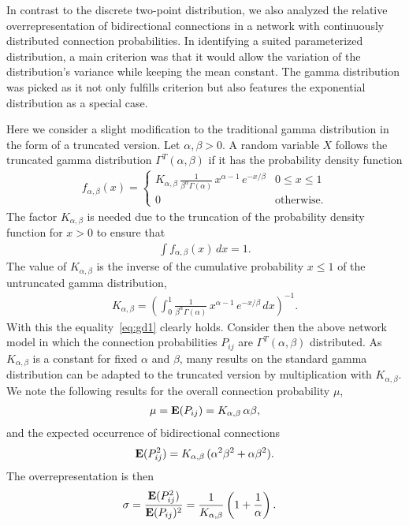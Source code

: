 
In contrast to the discrete two-point distribution, we also analyzed the relative overrepresentation of bidirectional connections in a network with continuously distributed connection probabilities. In identifying a suited parameterized distribution, a main criterion was that it would allow the variation of the distribution's variance while keeping the mean constant. The gamma distribution was picked as it not only fulfills criterion but also features the exponential distribution as a special case.

Here we consider a slight modification to the traditional gamma distribution in the form of a truncated version. Let $\alpha, \beta > 0$. A random variable $X$ follows the truncated gamma distribution $\Gamma^T(\alpha, \beta)$ if it has the probability density function 
%
\begin{align}
  f_{\alpha,\beta}(x) = \begin{cases} K_{\alpha, \beta}\,
\frac{1}{\beta^{\alpha}\Gamma(\alpha)}\, x^{\alpha-1}\,e^{-x/\beta} & 0 \leq x \leq 1 \\
0 & \text{otherwise}.
\end{cases}
\end{align}
%
The factor $K_{\alpha,\beta}$ is needed due to the truncation of the probability density function for $x>0$ to ensure that
\begin{align}
  \int f_{\alpha,\beta}(x) \,dx = 1. \label{eq:gd1}
\end{align}
The value of $K_{\alpha,\beta}$ is the inverse of the cumulative probability $x \leq 1$ of the untruncated gamma distribution,
\begin{align}
  K_{\alpha,\beta} = \left(\int_0^{1} \frac{1}{\beta^{\alpha}\Gamma(\alpha)}\, x^{\alpha-1}\,e^{-x/\beta} \, dx \right)^{-1}.
\end{align}
With this the equality~\eqref{eq:gd1} clearly holds. Consider then the above network model in which the connection probabilities $P_{ij}$ are $\Gamma^T(\alpha, \beta)$ distributed. As $K_{\alpha,\beta}$ is a constant for fixed $\alpha$ and $\beta$, many results on the standard gamma distribution can be adapted to the truncated version by multiplication with $K_{\alpha,\beta}$. We note the following results for the overall connection probability $\mu$,
%
\begin{align}
 \mu = \operatorname{\mathbf{E}}(P_{ij}) = K_{\alpha,\beta} \, \alpha \beta, \label{eq:gd1}
\end{align}
and the expected occurrence of bidirectional connections
\begin{align}
  \operatorname{\mathbf{E}}(P_{ij}^2) = K_{\alpha,\beta} \, (\alpha^2 \beta^2 + \alpha \beta^2).
\end{align}
%
The overrepresentation is then
\begin{align}
  \sigma & = \frac{\E(P_{ij}^2)}{\E(P_{ij})^2} =%
 \frac{1}{K_{\alpha,\beta}} \left(1 + \frac{1}{\alpha}\right).
\end{align}

